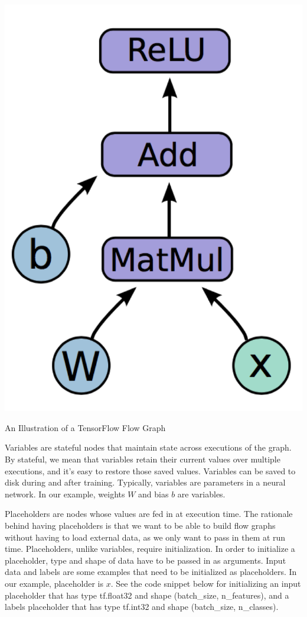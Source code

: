 \documentclass{tufte-handout}
\begin{document}
\begin{marginfigure}
	\centering
	\includegraphics[width=\linewidth]{tensorFlow.png}
	\caption {An Illustration of a TensorFlow Flow Graph}
	\label{fig:tensorFlow}
\end{marginfigure}

Variables are stateful nodes that maintain state across executions of the graph. By stateful, we mean that variables retain their current values over multiple executions, and it's easy to restore those saved values. Variables can be saved to disk during and after training. Typically, variables are parameters in a neural network. In our example, weights $W$ and bias $b$ are variables. 

Placeholders are nodes whose values are fed in at execution time. The rationale behind having placeholders is that we want to be able to build flow graphs without having to load external data, as we only want to pass in them at run time. Placeholders, unlike variables, require initialization. In order to initialize a placeholder, type and shape of data have to be passed in as arguments. Input data and labels are some examples that need to be initialized as placeholders. In our example, placeholder is $x$. See the code snippet below for initializing an input placeholder that has type tf.float32 and shape (batch\_size, n\_features), and a labels placeholder that has type tf.int32 and shape (batch\_size, n\_classes).
\end{document}

